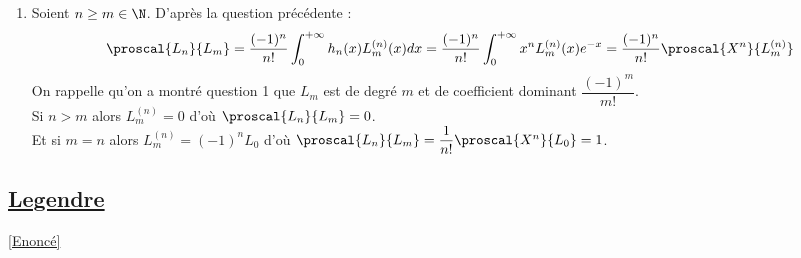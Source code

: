 \documentclass{book}
\begin{document}
\begin{enumerate}[leftmargin=*]
		On en déduit $\proscal{L_n}{P}=\displaystyle\frac{(-1)^p}{n!}\int_0^{+\infty}h_n^{(n-p)}(x)P^{(p)}(x)dx$.
		\item Soient $n\geq m\in \N$. D'après la question précédente :
		$$\proscal{L_n}{L_m}=\frac{(-1)^n}{n!}\int_0^{+\infty}h_n(x)L_m^{(n)}(x)dx=\frac{(-1)^n}{n!}\int_0^{+\infty}x^nL_m^{(n)}(x)e^{-x}=\frac{(-1)^n}{n!}\proscal{X^n}{L_m^{(n)}}$$
		On rappelle qu'on a montré question 1 que $L_m$ est de degré $m$ et de coefficient dominant $\dfrac{(-1)^m}{m!}$.\\
		Si $n>m$ alors $L_m^{(n)}=0$ d'où $\proscal{L_n}{L_m}=0$.\\
		Et si $m=n$ alors $L_m^{(n)}=(-1)^nL_0$ d'où $\proscal{L_n}{L_m}=\dfrac{1}{n!}\proscal{X^n}{L_0}=1$.
	\end{enumerate}
	
	\subsection{\underline{Legendre} }
	\label{sec:Legendre}
	\textcolor{blue}{\hyperref[Legendre]{[Enoncé]}}\\
\end{document}
